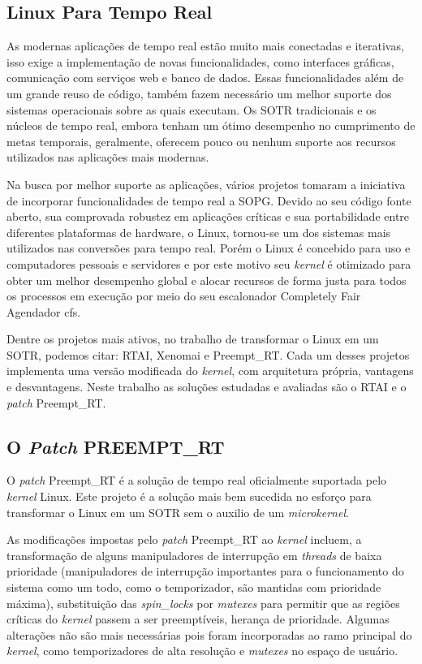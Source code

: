 \subsection{Linux Para Tempo Real}
As modernas aplicações de tempo real estão muito mais conectadas e iterativas, isso exige a implementação de novas funcionalidades, como interfaces gráficas, comunicação com serviços web e banco de dados. Essas funcionalidades além de um grande reuso de código, também fazem necessário um melhor suporte dos sistemas operacionais sobre as quais executam. Os SOTR tradicionais e os núcleos de tempo real, embora tenham um ótimo desempenho no cumprimento de metas temporais, geralmente, oferecem pouco ou nenhum suporte aos recursos utilizados nas aplicações mais modernas.

Na busca por melhor suporte as aplicações, vários projetos tomaram a iniciativa de incorporar funcionalidades de tempo real a SOPG. Devido ao seu código fonte aberto, sua comprovada robustez em aplicações críticas e sua portabilidade entre diferentes plataformas de hardware, o Linux, tornou-se um dos sistemas mais utilizados nas conversões para tempo real. Porém o Linux é concebido para uso e computadores pessoais e servidores e por este motivo seu \textit{kernel} é otimizado para obter um melhor desempenho global e alocar recursos de forma justa para todos os processos em execução por meio do seu escalonador Completely Fair Agendador \gls{cfs}. 

Dentre os projetos mais ativos, no trabalho de transformar o Linux em um SOTR, podemos citar: RTAI, Xenomai e Preempt\_RT. Cada um desses projetos implementa uma versão modificada do \textit{kernel}, com arquitetura própria, vantagens e desvantagens. Neste trabalho as soluções estudadas e avaliadas são o RTAI e o \textit{patch} Preempt\_RT.

\subsection{O \textit{Patch} PREEMPT\_RT}
O \textit{patch} Preempt\_RT é a solução de tempo real oficialmente suportada pelo \textit{kernel} Linux. Este projeto é a solução mais bem sucedida no esforço para transformar o Linux em um SOTR sem o auxilio de um \textit{microkernel}.

As modificações impostas pelo \textit{patch} Preempt\_RT ao \textit{kernel} incluem, a transformação de alguns manipuladores de interrupção em \textit{threads} de baixa prioridade (manipuladores de interrupção importantes para o funcionamento do sistema como um todo, como o temporizador, são mantidas com prioridade máxima), substituição das \textit{spin\_locks} por \textit{mutexes} para permitir que as regiões críticas do \textit{kernel} passem a ser preemptíveis, herança de prioridade. Algumas alterações não são mais necessárias pois foram incorporadas ao ramo principal do \textit{kernel}, como temporizadores de alta resolução e \textit{mutexes} no espaço de usuário.

